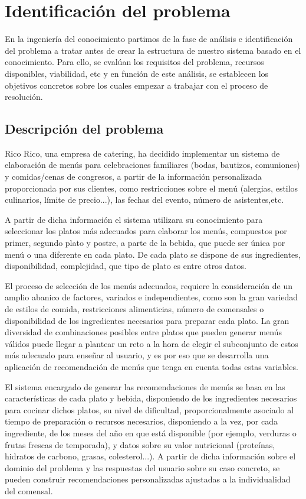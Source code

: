 \documentclass{article}
\begin{document}
\newpage
\section{Identificación del problema}
En la ingeniería del conocimiento partimos de la fase de análisis e identificación del problema a tratar antes de crear la estructura de nuestro sistema basado en el conocimiento.
Para ello, se evalúan los requisitos del problema, recursos disponibles, viabilidad, etc y en función de este análisis, se establecen los objetivos concretos sobre los cuales empezar a trabajar con el proceso de resolución.

\subsection{Descripción del problema}
Rico Rico, una empresa de catering, ha decidido implementar un sistema de elaboración de menús para celebraciones familiares (bodas, bautizos, comuniones) y comidas/cenas de congresos, a partir de la información personalizada proporcionada por sus clientes, como restricciones sobre el menú (alergias, estilos culinarios, límite de precio...), las fechas del evento, número de asistentes,etc.
\par
A partir de dicha información el sistema utilizara su conocimiento para seleccionar los platos más adecuados para elaborar los menús, compuestos por primer, segundo plato y postre, a parte de la bebida, que puede ser única por menú o una diferente en cada plato. De cada plato se dispone de sus ingredientes, disponibilidad, complejidad, que tipo de plato es entre otros datos.
\par
El proceso de selección de los menús adecuados, requiere la consideración de un amplio abanico de factores, variados e independientes, como son la gran variedad de estilos de comida, restricciones alimenticias, número de comensales o disponibilidad de los ingredientes necesarios para preparar cada plato. La gran diversidad de combinaciones posibles entre platos que pueden generar menús válidos puede llegar a plantear un reto a la hora de elegir el subconjunto de estos más adecuado para enseñar al usuario, y es por eso que se desarrolla una aplicación de recomendación de menús que tenga en cuenta todas estas variables.
\par
El sistema encargado de generar las recomendaciones de menús se basa en las características de cada plato y bebida, disponiendo de los ingredientes necesarios para cocinar dichos platos, su nivel de dificultad, proporcionalmente asociado al tiempo de preparación o recursos necesarios, disponiendo a la vez, por cada ingrediente, de los meses del año en que está disponible (por ejemplo, verduras o frutas frescas de temporada), y datos sobre su valor nutricional (proteínas, hidratos de carbono, grasas, colesterol...). A partir de dicha información sobre el dominio del problema y las respuestas del usuario sobre su caso concreto, se pueden construir recomendaciones personalizadas ajustadas a la individualidad del comensal.
\end{document}
